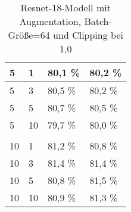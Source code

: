 \begin{table}[!htb]
\begin{tabular}{llll}
\multicolumn{1}{|l|}{5}                               & \multicolumn{1}{l|}{1}                                                                                 & \multicolumn{1}{l|}{80,1 \%}                            & \multicolumn{1}{l|}{80,2 \%}                                  \\ \hline
\multicolumn{1}{|l|}{5}                               & \multicolumn{1}{l|}{3}                                                                                 & \multicolumn{1}{l|}{80,5 \%}                            & \multicolumn{1}{l|}{80,2 \%}                                  \\ \hline
\multicolumn{1}{|l|}{5}                               & \multicolumn{1}{l|}{5}                                                                                 & \multicolumn{1}{l|}{80,7 \%}                            & \multicolumn{1}{l|}{80,5 \%}                                  \\ \hline
\multicolumn{1}{|l|}{5}                               & \multicolumn{1}{l|}{10}                                                                                & \multicolumn{1}{l|}{79,7 \%}                            & \multicolumn{1}{l|}{80,0 \%}                                  \\ \hline
                                                      &                                                                                                        &                                                         &                                                               \\ \hline
\multicolumn{1}{|l|}{10}                              & \multicolumn{1}{l|}{1}                                                                                 & \multicolumn{1}{l|}{81,2 \%}                            & \multicolumn{1}{l|}{80,8 \%}                                  \\ \hline
\multicolumn{1}{|l|}{10}                              & \multicolumn{1}{l|}{3}                                                                                 & \multicolumn{1}{l|}{81,4 \%}                            & \multicolumn{1}{l|}{81,4 \%}                                  \\ \hline
\multicolumn{1}{|l|}{10}                              & \multicolumn{1}{l|}{5}                                                                                 & \multicolumn{1}{l|}{80,8 \%}                            & \multicolumn{1}{l|}{81,5 \%}                                  \\ \hline
\multicolumn{1}{|l|}{10}                              & \multicolumn{1}{l|}{10}                                                                                & \multicolumn{1}{l|}{80,9 \%}                            & \multicolumn{1}{l|}{81,3 \%}                                  \\ \hline
\end{tabular}
\caption{Resnet-18-Modell mit Augmentation, Batch-Größe=64 und Clipping bei 1,0}
\label{tab:r18_exp1}
\end{table}